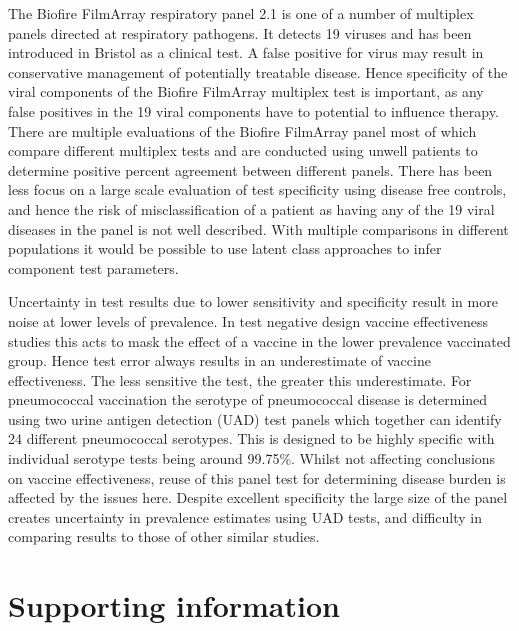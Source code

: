 \documentclass[10pt,letterpaper]{article}
\begin{document}
The Biofire FilmArray respiratory panel 2.1 is one of a number of multiplex panels directed at respiratory pathogens\cite{ramanan2017}. It detects 19 viruses\cite{chang2022,loeffelholz2020} and has been introduced in Bristol as a clinical test. A false positive for virus may result in conservative management of potentially treatable disease. Hence specificity of the viral components of the Biofire FilmArray multiplex test is important, as any false positives in the 19 viral components have to potential to influence therapy. There are multiple evaluations of the Biofire FilmArray panel\cite{popowitch2020,murphy2020,loeffelholz2020,leber2018,babady2013,chan2018} most of which compare different multiplex tests and are conducted using unwell patients to determine positive percent agreement between different panels. There has been less focus on a large scale evaluation of test specificity using disease free controls, and hence the risk of misclassification of a patient as having any of the 19 viral diseases in the panel is not well described. With multiple comparisons in different populations it would be possible to use latent class approaches to infer component test parameters\cite{johnson2001}.

Uncertainty in test results due to lower sensitivity and specificity result in more noise at lower levels of prevalence\cite{haile2022,endo2020}. In test negative design vaccine effectiveness studies this acts to mask the effect of a vaccine in the lower prevalence vaccinated group. Hence test error always results in an underestimate of vaccine effectiveness\cite{endo2020}. The less sensitive the test, the greater this underestimate. For pneumococcal vaccination the serotype of pneumococcal disease is determined using two urine antigen detection (UAD) test panels\cite{pride2012,bonten2015} which together can identify 24 different pneumococcal serotypes. This is designed to be highly specific with individual serotype tests being around 99.75\%. Whilst not affecting conclusions on vaccine effectiveness, reuse of this panel test for determining disease burden is affected by the issues here. Despite excellent specificity the large size of the panel creates uncertainty in prevalence estimates using UAD tests, and difficulty in comparing results to those of other similar studies.

\section*{Supporting information}
\end{document}
